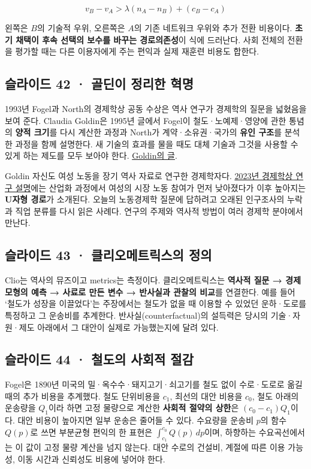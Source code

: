 \documentclass[10pt,a4paper]{article}
\begin{document}
\[
v_B-v_A>\lambda(n_A-n_B)+(c_B-c_A)
\]

왼쪽은 $B$의 기술적 우위, 오른쪽은 $A$의 기존 네트워크 우위와 추가 전환 비용이다. \textbf{초기 채택이 후속 선택의 보수를 바꾸는 경로의존성}이 식에 드러난다. 사회 전체의 전환을 평가할 때는 다른 이용자에게 주는 편익과 실제 재훈련 비용도 합한다.\par

\subsection{슬라이드 42 · 골딘이 정리한 혁명}
1993년 Fogel과 North의 경제학상 공동 수상은 역사 연구가 경제학의 질문을 넓혔음을 보여 준다. Claudia Goldin은 1995년 글에서 Fogel이 철도·노예제·영양에 관한 통념의 \textbf{양적 크기}를 다시 계산한 과정과 North가 계약·소유권·국가의 \textbf{유인 구조}를 분석한 과정을 함께 설명한다. 새 기술의 효과를 물을 때도 대체 기술과 그것을 사용할 수 있게 하는 제도를 모두 보아야 한다. \href{https://pubs.aeaweb.org/doi/10.1257/jep.9.2.191}{Goldin의 글}.\par

Goldin 자신도 여성 노동을 장기 역사 자료로 연구한 경제학자다. \href{https://www.nobelprize.org/prizes/economic-sciences/2023/goldin/facts/}{2023년 경제학상 연구 설명}에는 산업화 과정에서 여성의 시장 노동 참여가 먼저 낮아졌다가 이후 높아지는 \textbf{U자형 경로}가 소개된다. 오늘의 노동경제학 질문에 답하려고 오래된 인구조사의 누락과 직업 분류를 다시 읽은 사례다. 연구의 주제와 역사적 방법이 여러 경제학 분야에서 만난다.\par

\subsection{슬라이드 43 · 클리오메트릭스의 정의}
Clio는 역사의 뮤즈이고 metrics는 측정이다. 클리오메트릭스는 \textbf{역사적 질문 → 경제모형의 예측 → 사료로 만든 변수 → 반사실과 관찰의 비교}를 연결한다. 예를 들어 ‘철도가 성장을 이끌었다’는 주장에서는 철도가 없을 때 이용할 수 있었던 운하·도로를 특정하고 그 운송비를 추계한다. 반사실(counterfactual)의 설득력은 당시의 기술·자원·제도 아래에서 그 대안이 실제로 가능했는지에 달려 있다.\par

\subsection{슬라이드 44 · 철도의 사회적 절감}
Fogel은 1890년 미국의 밀·옥수수·돼지고기·쇠고기를 철도 없이 수로·도로로 옮길 때의 추가 비용을 추계했다. 철도 단위비용을 $c_1$, 최선의 대안 비용을 $c_0$, 철도 아래의 운송량을 $Q_1$이라 하면 고정 물량으로 계산한 \textbf{사회적 절약의 상한}은 $(c_0-c_1)Q_1$이다. 대안 비용이 높아지면 일부 운송은 줄어들 수 있다. 수요량을 운송비 $p$의 함수 $Q(p)$로 쓰면 부분균형 편익의 한 표현은 $\int_{c_1}^{c_0}Q(p)\,dp$이며, 하향하는 수요곡선에서는 이 값이 고정 물량 계산을 넘지 않는다. 대안 수로의 건설비, 계절에 따른 이용 가능성, 이동 시간과 신뢰성도 비용에 넣어야 한다.\par
\end{document}
